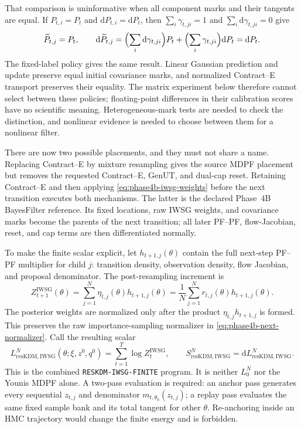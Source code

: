 \documentclass[11pt]{article}
\newcommand{\dd}{\mathrm{d}}
\newcommand{\GenUT}{\ensuremath{\mathrm{GenUT}}}
\begin{document}
That comparison is uninformative when all component marks and their tangents
are equal.  If $P_{t,i}=P_t$ and $\dd P_{t,i}=\dd P_t$, then
$\sum_i\gamma_{t,ji}=1$ and $\sum_i\dd\gamma_{t,ji}=0$ give
\begin{equation}
 \widetilde P_{t,j}=P_t,\qquad
 \dd\widetilde P_{t,j}
   =\Bigl(\sum_i\dd\gamma_{t,ji}\Bigr)P_t
      +\Bigl(\sum_i\gamma_{t,ji}\Bigr)\dd P_t
   =\dd P_t.
 \label{eq:phase4b-equal-marks}
\end{equation}
The fixed-label policy gives the same result.  Linear Gaussian prediction and
update preserve equal initial covariance marks, and normalized Contract--E
transport preserves their equality.  The matrix experiment below therefore
cannot select between these policies; floating-point differences in their
calibration scores have no scientific meaning.  Heterogeneous-mark tests are
needed to check the distinction, and nonlinear evidence is needed to choose
between them for a nonlinear filter.

There are now two possible placements, and they must not share a name.
Replacing Contract--E by mixture resampling gives the source MDPF placement
but removes the requested Contract--E, \GenUT{}, and dual-cap reset.  Retaining
Contract--E and then applying \eqref{eq:phase4b-iwsg-weights} before the next
transition executes both mechanisms.  The latter is the declared Phase~4B
BayesFilter reference.  Its fixed locations, raw IWSG weights, and covariance
marks become the parents of the next transition; all later PF--PF,
flow-Jacobian, reset, and cap terms are then differentiated normally.

To make the finite scalar explicit, let $h_{t+1,j}(\theta)$ contain the full
next-step PF--PF multiplier for child $j$: transition density, observation
density, flow Jacobian, and proposal denominator.  The post-resampling
increment is
\begin{equation}
 Z_{t+1}^{\mathrm{IWSG}}(\theta)
 =\sum_{j=1}^N\eta_{t,j}(\theta)h_{t+1,j}(\theta)
 =\frac1N\sum_{j=1}^N r_{t,j}(\theta)h_{t+1,j}(\theta).
 \label{eq:phase4b-next-normalizer}
\end{equation}
The posterior weights are normalized only after the product
$\eta_{t,j}h_{t+1,j}$ is formed.  This preserves the raw importance-sampling
normalizer in \eqref{eq:phase4b-next-normalizer}.  Call the resulting scalar
\begin{equation}
 L_{\mathrm{resKDM,IWSG}}^N(\theta;\xi,z^0,q^0)
 =\sum_{t=1}^T\log Z_t^{\mathrm{IWSG}},\qquad
 S_{\mathrm{resKDM,IWSG}}^N=\dd L_{\mathrm{resKDM,IWSG}}^N.
 \label{eq:phase4b-finite-target}
\end{equation}
This is the combined \texttt{RESKDM-IWSG-FINITE} program.  It is neither
$L_0^N$ nor the Younis MDPF alone.  A two-pass evaluation is required: an
anchor pass generates every sequential $z_{t,j}$ and denominator
$m_{t,\theta_0}(z_{t,j})$; a replay pass evaluates the same fixed sample bank
and its total tangent for other $\theta$.  Re-anchoring inside an HMC
trajectory would change the finite energy and is forbidden.
\end{document}

